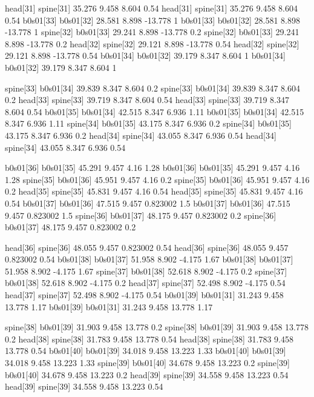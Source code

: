 head[31]    spine[31]    35.276    9.458    8.604    0.54
head[31]    spine[31]    35.276    9.458    8.604    0.54
b0s01[33]    b0s01[32]    28.581    8.898    -13.778    1
b0s01[33]    b0s01[32]    28.581    8.898    -13.778    1
spine[32]    b0s01[33]    29.241    8.898    -13.778    0.2
spine[32]    b0s01[33]    29.241    8.898    -13.778    0.2
head[32]    spine[32]    29.121    8.898    -13.778    0.54
head[32]    spine[32]    29.121    8.898    -13.778    0.54
b0s01[34]    b0s01[32]    39.179    8.347    8.604    1
b0s01[34]    b0s01[32]    39.179    8.347    8.604    1


spine[33]    b0s01[34]    39.839    8.347    8.604    0.2
spine[33]    b0s01[34]    39.839    8.347    8.604    0.2
head[33]    spine[33]    39.719    8.347    8.604    0.54
head[33]    spine[33]    39.719    8.347    8.604    0.54
b0s01[35]    b0s01[34]    42.515    8.347    6.936    1.11
b0s01[35]    b0s01[34]    42.515    8.347    6.936    1.11
spine[34]    b0s01[35]    43.175    8.347    6.936    0.2
spine[34]    b0s01[35]    43.175    8.347    6.936    0.2
head[34]    spine[34]    43.055    8.347    6.936    0.54
head[34]    spine[34]    43.055    8.347    6.936    0.54


b0s01[36]    b0s01[35]    45.291    9.457    4.16    1.28
b0s01[36]    b0s01[35]    45.291    9.457    4.16    1.28
spine[35]    b0s01[36]    45.951    9.457    4.16    0.2
spine[35]    b0s01[36]    45.951    9.457    4.16    0.2
head[35]    spine[35]    45.831    9.457    4.16    0.54
head[35]    spine[35]    45.831    9.457    4.16    0.54
b0s01[37]    b0s01[36]    47.515    9.457    0.823002    1.5
b0s01[37]    b0s01[36]    47.515    9.457    0.823002    1.5
spine[36]    b0s01[37]    48.175    9.457    0.823002    0.2
spine[36]    b0s01[37]    48.175    9.457    0.823002    0.2


head[36]    spine[36]    48.055    9.457    0.823002    0.54
head[36]    spine[36]    48.055    9.457    0.823002    0.54
b0s01[38]    b0s01[37]    51.958    8.902    -4.175    1.67
b0s01[38]    b0s01[37]    51.958    8.902    -4.175    1.67
spine[37]    b0s01[38]    52.618    8.902    -4.175    0.2
spine[37]    b0s01[38]    52.618    8.902    -4.175    0.2
head[37]    spine[37]    52.498    8.902    -4.175    0.54
head[37]    spine[37]    52.498    8.902    -4.175    0.54
b0s01[39]    b0s01[31]    31.243    9.458    13.778    1.17
b0s01[39]    b0s01[31]    31.243    9.458    13.778    1.17


spine[38]    b0s01[39]    31.903    9.458    13.778    0.2
spine[38]    b0s01[39]    31.903    9.458    13.778    0.2
head[38]    spine[38]    31.783    9.458    13.778    0.54
head[38]    spine[38]    31.783    9.458    13.778    0.54
b0s01[40]    b0s01[39]    34.018    9.458    13.223    1.33
b0s01[40]    b0s01[39]    34.018    9.458    13.223    1.33
spine[39]    b0s01[40]    34.678    9.458    13.223    0.2
spine[39]    b0s01[40]    34.678    9.458    13.223    0.2
head[39]    spine[39]    34.558    9.458    13.223    0.54
head[39]    spine[39]    34.558    9.458    13.223    0.54


